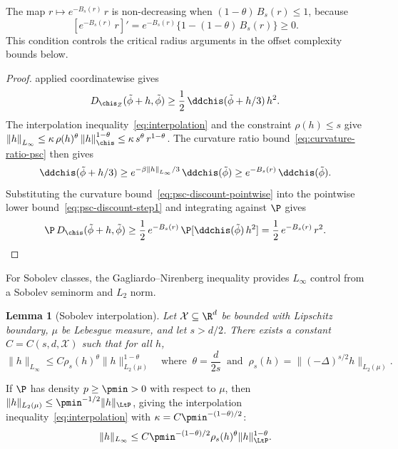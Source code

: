 \documentclass{article}
\newtheorem{lemma}[theorem]{Lemma}
\begin{document}
The map $r \mapsto e^{-B_s(r)}\, r$
is non-decreasing when $(1-\theta)\, B_s(r) \le 1$,
because
\begin{equation}
\label{eq:psc-monotonicity}
[e^{-B_s(r)}\, r]'
  = e^{-B_s(r)}\{1 - (1-\theta)\, B_s(r)\} \ge 0.
\end{equation}
This condition controls the critical radius arguments
in the offset complexity bounds below.

\begin{proof}
 applied coordinatewise gives
\begin{equation}
\label{eq:psc-discount-step1}
D_{\chis_Z}(\tilde\phi + h, \tilde\phi)
  \ge \frac{1}{2}\,\ddchis(\tilde\phi + h/3)\, h^2.
\end{equation}
The interpolation inequality~\eqref{eq:interpolation}
and the constraint $\rho(h) \le s$ give
$\norm{h}_{L_\infty}
  \le \kappa\,\rho(h)^\theta\,\norm{h}_{\chis}^{1-\theta}
  \le \kappa\, s^\theta\, r^{1-\theta}$.
The curvature ratio bound~\eqref{eq:curvature-ratio-psc}
then gives
\begin{equation}
\label{eq:psc-discount-pointwise}
\ddchis(\tilde\phi + h/3)
  \ge e^{-\beta\norm{h}_{L_\infty}/3}\,\ddchis(\tilde\phi)
  \ge e^{-B_s(r)}\,\ddchis(\tilde\phi).
\end{equation}
Substituting the curvature bound~\eqref{eq:psc-discount-pointwise}
into the pointwise lower bound~\eqref{eq:psc-discount-step1}
and integrating against $\P$ gives
\[
\P\, D_{\chis}(\tilde\phi + h, \tilde\phi)
  \ge \frac{1}{2}\, e^{-B_s(r)}\,
    \P[\ddchis(\tilde\phi)\, h^2]
  = \frac{1}{2}\, e^{-B_s(r)}\, r^2.
  \qedhere
\]
\end{proof}

For Sobolev classes, the Gagliardo--Nirenberg inequality provides $L_\infty$ control from a Sobolev seminorm and $L_2$ norm.

\begin{lemma}[Sobolev interpolation]
\label{lem:sobolev-interpolation}
Let $\mathcal{X} \subseteq \R^d$ be bounded with Lipschitz boundary, $\mu$ be Lebesgue measure,
and let $s > d/2$. There exists a constant $C = C(s, d, \mathcal{X})$ such that for all $h$,
\[
\|h\|_{L_\infty} \le C \rho_s(h)^\theta \|h\|_{L_2(\mu)}^{1-\theta} \quad \text{where } \ \theta = \frac{d}{2s} \ \text{ and } \ \rho_s(h) = \|(-\Delta)^{s/2} h\|_{L_2(\mu)}.
\]
\end{lemma}

If $\P$ has density $p \ge \pmin > 0$ with respect to $\mu$, then $\|h\|_{L_2(\mu)} \le \pmin^{-1/2} \|h\|_{\LtP}$, giving the interpolation inequality~\eqref{eq:interpolation} with $\kappa = C\pmin^{-(1-\theta)/2}$:
\begin{equation}
\label{eq:sobolev-interpolation}
\|h\|_{L_\infty} \le C \pmin^{-(1-\theta)/2} \rho_s(h)^\theta \|h\|_{\LtP}^{1-\theta}.
\end{equation}
\end{document}
